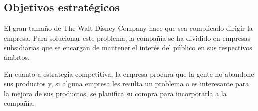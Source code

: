 \subsection{Objetivos estratégicos}
El gran tamaño de The Walt Disney Company hace que sea complicado dirigir la empresa. Para solucionar este problema, la compañía se ha dividido en empresas subsidiarias que se encargan de mantener el interés del público en sus respectivos ámbitos.

En cuanto a estrategia competitiva, la empresa procura que la gente no abandone sus productos y, si alguna empresa les resulta un problema o es interesante para la mejora de sus productos, se planifica su compra para incorporarla a la compañía.
